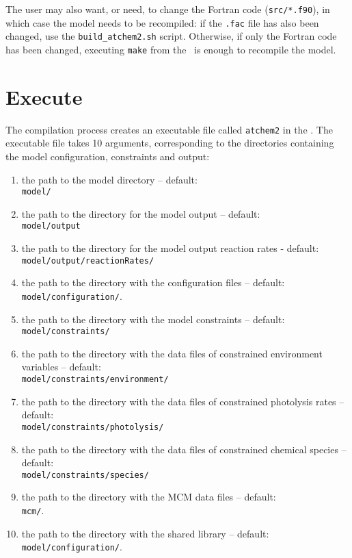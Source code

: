 The user may also want, or need, to change the Fortran code
(\texttt{src/*.f90}), in which case the model needs to be recompiled:
if the \texttt{.fac} file has also been changed, use the
\texttt{build\_atchem2.sh} script. Otherwise, if only the Fortran code
has been changed, executing \texttt{make} from the \maindir\ is enough
to recompile the model.

\section{Execute} \label{sec:execute}

The compilation process creates an executable file called
\texttt{atchem2} in the \maindir. The executable file
takes 10 arguments, corresponding to the directories containing the
model configuration, constraints and output:

\begin{enumerate}
\item the path to the model directory -- default:\\
  \texttt{model/}
\item the path to the directory for the model output -- default:\\
  \texttt{model/output}
\item the path to the directory for the model output reaction rates -
  default:\\
  \texttt{model/output/reactionRates/}
\item the path to the directory with the configuration files --
  default:\\
  \texttt{model/configuration/}.
\item the path to the directory with the model constraints -- default:\\
  \texttt{model/constraints/}
\item the path to the directory with the data files of constrained
  environment variables -- default:\\
  \texttt{model/constraints/environment/}
\item the path to the directory with the data files of constrained
  photolysis rates -- default:\\
  \texttt{model/constraints/photolysis/}
\item the path to the directory with the data files of constrained
  chemical species -- default:\\
  \texttt{model/constraints/species/}
\item the path to the directory with the MCM data files -- default:\\
  \texttt{mcm/}.
\item the path to the directory with the shared library -- default:\\
  \texttt{model/configuration/}.
\end{enumerate}


